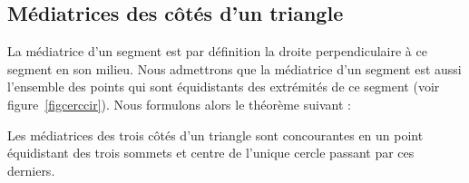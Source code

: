 \subsection{Médiatrices des côtés d'un triangle}
 La médiatrice d'un segment est par définition la droite perpendiculaire à ce segment en son milieu. Nous admettrons que la médiatrice d'un segment est aussi l'ensemble des points qui sont équidistants des extrémités de ce segment (voir figure \ref{figcerccir}). Nous formulons alors le théorème suivant :
%
%
%
%
%

\begin{thm}
Les médiatrices des trois côtés d'un triangle sont concourantes en un point équidistant des trois sommets et centre de l'unique cercle passant par ces derniers.
\end{thm}

